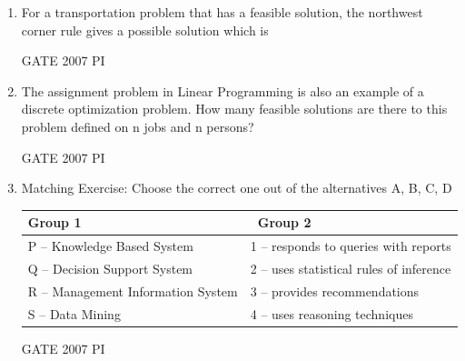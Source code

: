\documentclass[journal,12pt,onecolumn]{IEEEtran}
\theoremstyle{remark}
\begin{document}
\begin{enumerate}
\item 
For a transportation problem that has a feasible solution, the northwest corner rule gives a possible solution which is

\hfill{GATE 2007 PI}
\begin{enumerate}
    \end{enumerate}
    
   \item
The assignment problem in Linear Programming is also an example of a discrete optimization problem. How many feasible solutions are there to this problem defined on n jobs and n persons?

\hfill{GATE 2007 PI}
\begin{enumerate}
\end{enumerate}

\item 
{Matching Exercise:} Choose the correct one out of the alternatives A, B, C, D

\begin{tabular}{|l|l|}
\hline
{Group 1} & \ {Group 2} \\ \hline
P -- Knowledge Based System        & 1 -- responds to queries with reports \\ \hline
Q -- Decision Support System       & 2 -- uses statistical rules of inference \\ \hline R -- Management Information System & 3 -- provides recommendations \\ \hline
S -- Data Mining                   & 4 -- uses reasoning techniques \\ \hline
\end{tabular}

\hfill{GATE 2007 PI}
\begin{enumerate}
\end{enumerate}


\end{enumerate}
\end{document}
